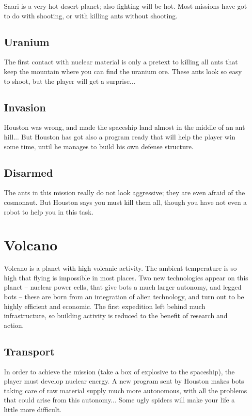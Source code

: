 Saari is a very hot desert planet; also fighting will be hot. Most missions have got to do with shooting, or with killing ants without shooting.


\subsection{Uranium}

The first contact with nuclear material is only a pretext to killing all ants that keep the mountain where you can find the uranium ore. These ants look so easy to shoot, but the player will get a surprise...


\subsection{Invasion}

Houston was wrong, and made the spaceship land almost in the middle of an ant hill... But Houston has got also a program ready that will help the player win some time, until he manages to build his own defense structure.


\subsection{Disarmed}

The ants in this mission really do not look aggressive; they are even afraid of the cosmonaut. But Houston says you must kill them all, though you have not even a robot to help you in this task.


\newpage
\section{Volcano}

Volcano is a planet with high volcanic activity. The ambient temperature is so high that flying is impossible in most places. Two new technologies appear on this planet -- nuclear power cells, that give bots a much larger autonomy, and legged bots -- these are born from an integration of alien technology, and turn out to be highly efficient and economic. The first expedition left behind much infrastructure, so building activity is reduced to the benefit of research
and action.


\subsection{Transport}

In order to achieve the mission (take a box of explosive to the spaceship), the player must develop nuclear energy. A new program sent by Houston makes bots taking care of raw material supply much more autonomous, with all the problems that could arise from this autonomy... Some ugly spiders will make your life a little more difficult.


